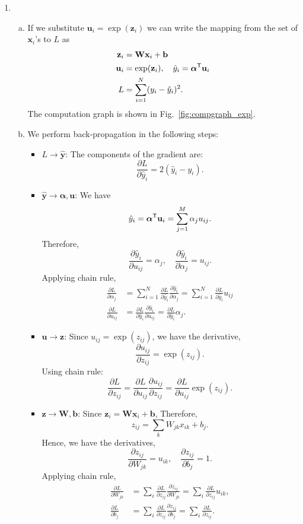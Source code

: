 \documentclass[11pt]{article}
\def\arr{\rightarrow}
\newcommand{\bbf}{\mathbf{b}}
\newcommand{\ubf}{\mathbf{u}}
\newcommand{\xbf}{\mathbf{x}}
\newcommand{\ybf}{\mathbf{y}}
\newcommand{\zbf}{\mathbf{z}}
\newcommand{\Wbf}{\mathbf{W}}
\def\alphabf{{\boldsymbol \alpha}}
\newcommand{\tran}{^{\text{\sf T}}}
\begin{document}
\begin{enumerate}
\item

\begin{enumerate}[(a)]
\item If we substitute $\ubf_i = \exp(\zbf_i)$ we can write the mapping from
the set of $\xbf_i$'s to $L$ as
\begin{align*}
    \zbf_i    &= \Wbf\xbf_i + \bbf \\
    \ubf_i &= \exp(\zbf_i), \quad \hat{y}_i = \alphabf\tran \ubf_i \\
    L &= \sum_{i=1}^N (y_i-\hat{y}_i)^2.
\end{align*}
The computation graph is shown in Fig.~\ref{fig:compgraph_exp}.

\item We perform back-propagation in the following steps:
\begin{itemize}
\item $L \arr \hat{\ybf}$:  The components of the gradient are:
\[
    \frac{\partial L}{\partial \hat{y}_i} = 2(\hat{y}_i - y_i).
\]

\item $\hat{\ybf} \arr \alphabf, \ubf$:  We have
\[
    \hat{y}_i = \alphabf\tran \ubf_i = \sum_{j=1}^M \alpha_ju_{ij}.
\]
Therefore,
\[
    \frac{\partial \hat{y}_i}{\partial u_{ij}} = \alpha_j, \quad
    \frac{\partial \hat{y}_i}{\partial \alpha_j} = u_{ij}.
\]
Applying chain rule,
\begin{align*}
    \frac{\partial L}{\partial \alpha_j} &= \sum_{i=1}^N
    \frac{\partial L}{\partial \hat{y}_i}\frac{\partial \hat{y}_i}{\partial \alpha_j}
    = \sum_{i=1}^N  \frac{\partial L}{\partial \hat{y}_i}u_{ij} \\
    \frac{\partial L}{\partial u_{ij}} &=
    \frac{\partial L}{\partial \hat{y}_i}\frac{\partial \hat{y}_i}{\partial u_{ij}}
    =  \frac{\partial L}{\partial \hat{y}_i}\alpha_j.
\end{align*}

\item $\ubf \arr \zbf$: Since $u_{ij} = \exp(z_{ij})$, we have the derivative,
\[
    \frac{\partial u_{ij}}{\partial z_{ij}} = \exp(z_{ij}).
\]
Using chain rule:
\[
    \frac{\partial L}{\partial z_{ij}} = \frac{\partial L}{\partial u_{ij}}\frac{\partial u_{ij}}{\partial z_{ij}}
    = \frac{\partial L}{\partial u_{ij}}\exp(z_{ij}).
\]

\item $\zbf \arr \Wbf,\bbf$:  Since $\zbf_i = \Wbf\xbf_i + \bbf$,
Therefore,
\[
    z_{ij} = \sum_k W_{jk}x_{ik} + b_j.
\]
Hence, we have the derivatives,
\[
    \frac{\partial z_{ij}}{\partial W_{jk}} = u_{ik}, \quad
    \frac{\partial z_{ij}}{\partial b_{j}} = 1.
\]
Applying chain rule,
\begin{align*}
    \frac{\partial L}{\partial W_{jk}} &=
        \sum_i \frac{\partial L}{\partial z_{ij}}\frac{\partial z_{ij}}{\partial W_{jk}}
        = \sum_i \frac{\partial L}{\partial z_{ij}}u_{ik}, \\
    \frac{\partial L}{\partial b_{j}} &=
        \sum_i \frac{\partial L}{\partial z_{ij}}\frac{\partial z_{ij}}{\partial b_{j}}
        = \sum_i \frac{\partial L}{\partial z_{ij}}.
\end{align*}


\end{itemize}
\end{enumerate}
\end{enumerate}
\end{document}
